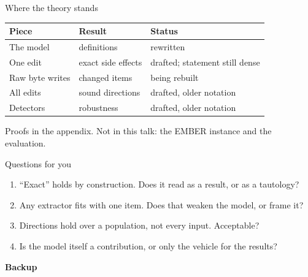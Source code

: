 \documentclass[aspectratio=169,11pt]{beamer}
\newcommand{\good}[1]{\textcolor{green!45!black}{#1}}
\newcommand{\bad}[1]{\textcolor{red!70!black}{#1}}
\begin{document}
\begin{frame}{Where the theory stands}
  \renewcommand{\arraystretch}{1.35}
  \begin{center}
    \begin{tabular}{@{}lll@{}}
      \toprule
      \textbf{Piece} & \textbf{Result} & \textbf{Status} \\
      \midrule
      The model & definitions & \good{rewritten} \\
      One edit & exact side effects & drafted; statement still dense \\
      Raw byte writes & changed items & \bad{being rebuilt} \\
      All edits & sound directions & drafted, older notation \\
      Detectors & robustness & drafted, older notation \\
      \bottomrule
    \end{tabular}
  \end{center}
  \vfill
  \begin{center}
    Proofs in the appendix. Not in this talk: the EMBER instance and the evaluation.
  \end{center}
\end{frame}

\begin{frame}{Questions for you}
  \begin{enumerate}
    \setlength{\itemsep}{0.8em}
    \item ``Exact'' holds by construction. Does it read as a result, or as a tautology?
    \item Any extractor fits with one item. Does that weaken the model, or frame it?
    \item Directions hold over a population, not every input. Acceptable?
    \item Is the model itself a contribution, or only the vehicle for the results?
  \end{enumerate}
\end{frame}


\appendix

\begin{frame}
  \begin{center}
    \Huge\textcolor{blue!50!black}{\textbf{Backup}}
  \end{center}
\end{frame}
\end{document}
